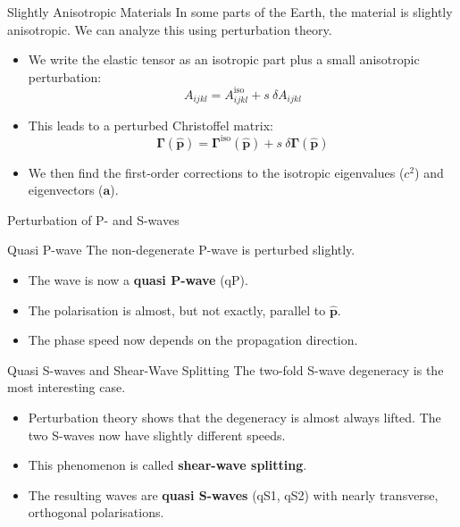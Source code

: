 \documentclass{beamer}
\begin{document}

\begin{frame}{Slightly Anisotropic Materials}
    In some parts of the Earth, the material is slightly anisotropic. We can analyze this using perturbation theory.
    \begin{itemize}
        \item We write the elastic tensor as an isotropic part plus a small anisotropic perturbation:
        $$ A_{ijkl} = A^{\text{iso}}_{ijkl} + s~\delta A_{ijkl} $$
        \pause
        \item This leads to a perturbed Christoffel matrix:
        $$ \mathbf{\Gamma}(\hat{\mathbf{p}}) = \mathbf{\Gamma}^{\text{iso}}(\hat{\mathbf{p}}) + s~\delta\mathbf{\Gamma}(\hat{\mathbf{p}}) $$
        \pause
        \item We then find the first-order corrections to the isotropic eigenvalues ($c^2$) and eigenvectors ($\mathbf{a}$).
    \end{itemize}
\end{frame}

\begin{frame}{Perturbation of P- and S-waves}
    \begin{block}{Quasi P-wave}
        The non-degenerate P-wave is perturbed slightly.
        \begin{itemize}
            \item The wave is now a \textbf{quasi P-wave} (qP).
            \item The polarisation is almost, but not exactly, parallel to $\hat{\mathbf{p}}$.
            \item The phase speed now depends on the propagation direction.
        \end{itemize}
    \end{block}
    \pause
    \begin{block}{Quasi S-waves and Shear-Wave Splitting}
        The two-fold S-wave degeneracy is the most interesting case.
        \begin{itemize}
            \item Perturbation theory shows that the degeneracy is almost always lifted. The two S-waves now have slightly different speeds.
            \item This phenomenon is called \textbf{shear-wave splitting}.
            \item The resulting waves are \textbf{quasi S-waves} (qS1, qS2) with nearly transverse, orthogonal polarisations.
        \end{itemize}
    \end{block}
\end{frame}
\end{document}

